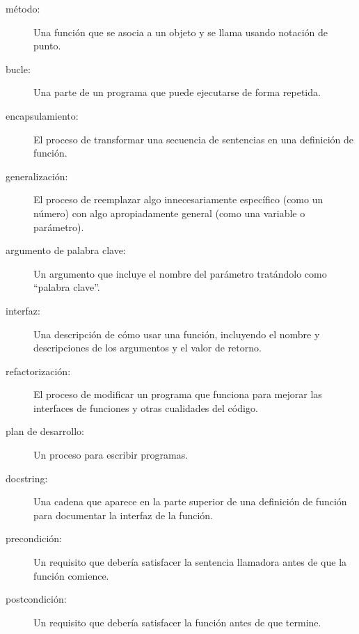 \documentclass[10pt]{book}
\begin{document}
\begin{description}

\item[método:] Una función que se asocia a un objeto y se llama
usando notación de punto.

\item[bucle:] Una parte de un programa que puede ejecutarse de forma repetida.

\item[encapsulamiento:] El proceso de transformar una secuencia de
sentencias en una definición de función.

\item[generalización:] El proceso de reemplazar algo
innecesariamente específico (como un número) con algo apropiadamente
general (como una variable o parámetro).

\item[argumento de palabra clave:] Un argumento que incluye el nombre del
parámetro tratándolo como ``palabra clave''.

\item[interfaz:] Una descripción de cómo usar una función, incluyendo
el nombre y descripciones de los argumentos y el valor de retorno.

\item[refactorización:] El proceso de modificar un programa que funciona para
  mejorar las interfaces de funciones y otras cualidades del código.

\item[plan de desarrollo:] Un proceso para escribir programas.

\item[docstring:] Una cadena que aparece en la parte superior de una definición
  de función para documentar la interfaz de la función.

\item[precondición:] Un requisito que debería satisfacer la
sentencia llamadora antes de que la función comience.

\item[postcondición:] Un requisito que debería satisfacer la
función antes de que termine.

\end{description}
\end{document}

